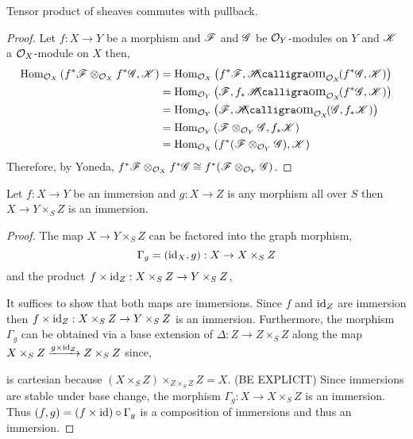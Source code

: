 \documentclass[12pt]{article}
\begin{document}
\begin{lemma}
Tensor product of sheaves commutes with pullback.
\end{lemma}

\begin{proof}
Let $f : X \to Y$ be a morphism and $\mathscr{F}$ and $\mathscr{G}$ be $\mathcal{O}_{Y}$-modules on $Y$ and $\mathscr{K}$ a $\mathcal{O}_{X}$-module on $X$ then,
\begin{align*}
\Hom{\struct{X}}{f^* \F \otimes_{\struct{X}} f^* \G}{\K} & = \Hom{\struct{X}}{f^* \F}{\shHom{\struct{X}}{f^* \G}{\K}}
\\
& = \Hom{\struct{Y}}{\F}{f_* \shHom{\struct{X}}{f^* \G}{\K}}
\\
& = \Hom{\struct{Y}}{\F}{\shHom{\struct{X}}{\G}{f_* \K}}
\\
& = \Hom{\struct{Y}}{\F \otimes_{\struct{Y}} \G}{f_* \K}
\\
& = \Hom{\struct{X}}{f^* (\F \otimes_{\struct{Y}} \G)}{\K}
\end{align*}
Therefore, by Yoneda, $f^* \mathscr{F} \otimes_{\mathcal{O}_{X}} f^* \mathscr{G} \cong f^* (\mathscr{F} \otimes_{\mathcal{O}_{Y}} \mathscr{G})$. 
\end{proof}

\begin{lemma} \label{product_of_immersion}
Let $f : X \to Y$ be an immersion and $g : X \to Z$ is any morphism all over $S$ then $X \to Y \times_S Z$ is an immersion. 
\end{lemma}

\begin{proof}
The map $X \to Y \times_S Z$ can be factored into the graph morphism,
\[ \Gamma_g = (\mathrm{id}_X, g) : X \to X \times_S Z \]
and the product $f \times \mathrm{id}_Z : X \times_S Z \to Y \times_S Z$,
\begin{center}
\end{center}
It suffices to show that both maps are immersions. Since $f$ and $\mathrm{id}_Z$ are immersion then $f \times \mathrm{id}_Z : X \times_S Z \to Y \times_S Z$ is an immersion. Furthermore, the morphism $\Gamma_g$ can be obtained via a base extension of $\Delta : Z \to Z \times_S Z$ along the map $X \times_S Z \xrightarrow{g \times \mathrm{id}_Z} Z \times_S Z$ since,
\begin{center}
\end{center}
is cartesian because $(X \times_S Z) \times_{Z \times_S Z} Z = X$. (BE EXPLICIT) Since immersions are stable under base change, the morphism $\Gamma_g : X \to X \times_S Z$ is an immersion. Thus $(f, g) =  (f \times \mathrm{id}) \circ \Gamma_g$ is a composition of immersions and thus an immersion. 
\end{proof}
\end{document}

